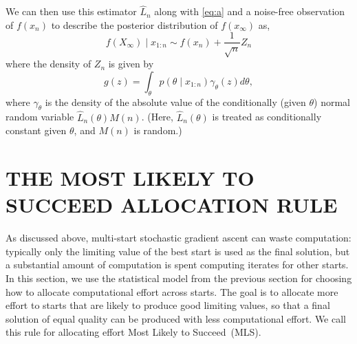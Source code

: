 \documentclass{wscpaperproc}
\theoremstyle{wsc}
\newcommand{\abbrv}{MLS}
\newcommand{\name}{Most Likely to Succeed}
\begin{document}
We can then use this estimator $\hat{L}_n$ along with \eqref{eq:a} and a noise-free observation of $f(x_n)$ to describe the posterior distribution of $f(x_\infty)$ as,
\[
f\left(X_{\infty}\right)\mid x_{1:n} \sim f\left(x_{n}\right)+\frac{1}{\sqrt{n}}Z_{n}
\]
where the density of $Z_{n}$ is given by 
\[
g\left(z\right)=\int_{\theta}p\left(\theta\mid x_{1:n}\right)\gamma_{\theta}\left(z\right)d\theta,
\]
where $\gamma_{\theta}$ is the density of the absolute value of the conditionally (given $\theta$) normal random variable $\hat{L}_n(\theta) M(n)$. (Here, $\hat{L}_n(\theta)$ is treated as conditionally constant given $\theta$, and $M(n)$ is random.)




\section{THE MOST LIKELY TO SUCCEED ALLOCATION RULE}
\label{MLS}


As discussed above, multi-start stochastic gradient ascent can waste computation: typically only the limiting value of the best start is used as the final solution, but a substantial amount of computation is spent computing iterates for other starts.  In this section, we use the statistical model from the previous section for choosing how to allocate computational effort across starts.  The goal is to allocate more effort to starts that are likely to produce good limiting values, so that a final solution of equal quality can be produced with less computational effort. We call this rule for allocating effort \name\ (\abbrv).
\end{document}
